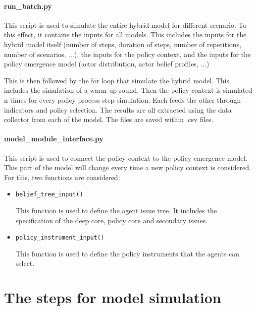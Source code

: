 \documentclass[12pt]{article}
\begin{document}
\paragraph{run\_batch.py}

This script is used to simulate the entire hybrid model for different scenario. To this effect, it contains the inputs for all models. This includes the inputs for the hybrid model itself (number of steps, duration of steps, number of repetitions, number of scenarios, ...), the inputs for the policy context, and the inputs for the policy emergence model (actor distribution, actor belief profiles, ...)

This is then followed by the for loop that simulate the hybrid model. This includes the simulation of a warm up round. Then the policy context is simulated n times for every policy process step simulation. Each feeds the other through indicators and policy selection. The results are all extracted using the data collector from each of the model. The files are saved within .csv files.

\paragraph{model\_module\_interface.py}

This script is used to connect the policy context to the policy emergence model. This part of the model will change every time a new policy context is considered. For this, two functions are considered:

\begin{itemize}
\item \texttt{belief\_tree\_input()}

This function is used to define the agent issue tree. It includes the specification of the deep core, policy core and secondary issues.

\item \texttt{policy\_instrument\_input()}

This function is used to define the policy instruments that the agents can select.

\end{itemize}


\section{The steps for model simulation}
\label{sec:}
\end{document}
